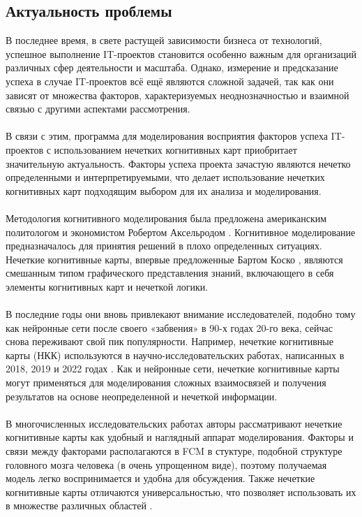 \documentclass{article}
\begin{document}
    \subsection {Актуальность проблемы}
    В последнее время, в свете растущей зависимости бизнеса от технологий, успешное выполнение IT-проектов становится особенно важным для организаций различных сфер деятельности и масштаба. Однако, измерение и предсказание успеха в случае IT-проектов всё ещё являются сложной задачей, так как они зависят от множества факторов, характеризуемых неоднозначностью и взаимной связью с другими аспектами рассмотрения.\\
    ~\\
    \lefttable
    В связи с этим, программа для моделирования восприятия факторов успеха IT-проектов с использованием нечетких когнитивных карт приобритает значительную актуальность. Факторы успеха проекта зачастую являются нечетко определенными и интерпретируемыми, что делает использование нечетких когнитивных карт подходящим выбором для их анализа и моделирования.\\
    ~\\
    Методология когнитивного моделирования была предложена американским политологом и экономистом Робертом Аксельродом \cite{litlink12}. Когнитивное моделирование предназначалось для принятия решений в плохо определенных ситуациях. Нечеткие когнитивные карты, впервые предложенные Бартом Коско \cite{litlink13}, являются смешанным типом графического представления знаний, включающего в себя элементы когнитивных карт и нечеткой логики.\\
    ~\\
    В последние годы они вновь привлекают внимание исследователей, подобно тому как нейронные сети после своего «забвения» в 90-х годах 20-го века, сейчас снова переживают свой пик популярности. Например, нечеткие когнитивные карты (НКК) используются в научно-исследовательских работах, написанных в 2018, 2019 и 2022 годах \cite{litlink14, litlink15, litlink16}. Как и нейронные сети, нечеткие когнитивные карты могут применяться для моделирования сложных взаимосвязей и получения результатов на основе неопределенной и нечеткой информации.\\
    ~\\
    В многочисленных исследовательских работах авторы рассматривают нечеткие когнитивные карты как удобный и наглядный аппарат моделирования. Факторы и связи между факторами располагаются в FCM в стуктуре, подобной структуре головного мозга человека (в очень упрощенном виде), поэтому получаемая модель легко воспринимается и удобна для обсуждения. Также нечеткие когнитивные карты отличаются универсальностью, что позволяет использовать их в множестве различных областей \cite{litlink17}.\\
\end{document}
